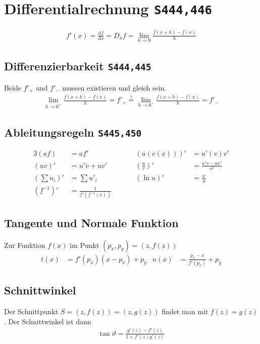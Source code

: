 \documentclass[a4paper, twocolumn]{article}
\newcommand{\noticeq}{\ensuremath{\stackrel{!}{=}}}
\newcommand{\dd}[1]{\ensuremath{\mathrm{d}#1}}
\newcommand{\df}[2]{\ensuremath{\frac{\dd{#1}}{\dd{#2}}}}
\newcommand{\brpage}[1]{\textcolor{red!70!black}{\small\texttt{S#1}}}
\begin{document}
{\section{Differentialrechnung \brpage{444,446}}
\begin{align*}
  f'(x) = \df{f}{x} = D_x f = \lim_{h\to 0} \frac{f(x+h) - f(x)}{h}
\end{align*}

\subsection{Differenzierbarkeit \brpage{444,445}}
Beide \(f'_+ \text{ und } f'_-\) mussen existieren und gleich sein.
\begin{align*}
  \lim_{h\to 0^+} \frac{f(x+h) - f(x)}{h} = f'_+ \noticeq \lim_{h\to 0^-} \frac{f(x+h) - f(x)}{h} = f'_-
\end{align*}

\subsection{Ableitungsregeln \brpage{445,450}}
\begin{alignat*}{3}
  (af) &= af' &\quad&& (u(v(x)))' &= u'(v)v' \\
  (uv)' &= u'v + uv' &\quad&& \left(\frac{u}{v}\right)' &= \frac{u'v-uv'}{v^2} \\
  \left(\sum u_i\right)' &= \sum u'_i &\quad&& (\ln u)' &= \frac{u'}{u} \\
  (f^{-1})' &= \frac{1}{f'(f^{-1}(x))}
\end{alignat*}

\subsection{Tangente und Normale Funktion}
Zur Funktion \(f(x)\) im Punkt \((p_x, p_y) = (z, f(z))\)
\begin{align*}
  t(x) &= f'(p_x)(x - p_x) + p_y &
  n(x) &= \frac{p_x - x}{f'(p_x)} + p_y
\end{align*}

\subsection{Schnittwinkel}
Der Schnittpunkt \(S = (z,f(z)) = (z,g(z))\) findet man mit \(f(z) = g(z)\). Der Schnittwinkel ist dann
\begin{align*}
  \tan\vartheta = \frac{g'(z) - f'(z)}{1 + f'(z)g'(z)}
\end{align*}

}
\end{document}
